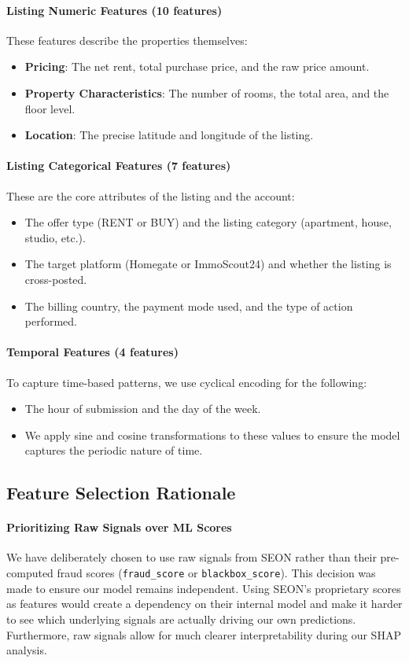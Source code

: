 \paragraph{Listing Numeric Features (10 features)}
These features describe the properties themselves:
\begin{itemize}
    \item \textbf{Pricing}: The net rent, total purchase price, and the raw price amount.
    \item \textbf{Property Characteristics}: The number of rooms, the total area, and the floor level.
    \item \textbf{Location}: The precise latitude and longitude of the listing.
\end{itemize}

\paragraph{Listing Categorical Features (7 features)}
These are the core attributes of the listing and the account:
\begin{itemize}
    \item The offer type (RENT or BUY) and the listing category (apartment, house, studio, etc.).
    \item The target platform (Homegate or ImmoScout24) and whether the listing is cross-posted.
    \item The billing country, the payment mode used, and the type of action performed.
\end{itemize}

\paragraph{Temporal Features (4 features)}
To capture time-based patterns, we use cyclical encoding for the following:
\begin{itemize}
    \item The hour of submission and the day of the week.
    \item We apply sine and cosine transformations to these values to ensure the model captures the periodic nature of time.
\end{itemize}

\subsection{Feature Selection Rationale}

\paragraph{Prioritizing Raw Signals over ML Scores}
We have deliberately chosen to use raw signals from SEON rather than their pre-computed fraud scores (\texttt{fraud\_score} or \texttt{blackbox\_score}). This decision was made to ensure our model remains independent. Using SEON's proprietary scores as features would create a dependency on their internal model and make it harder to see which underlying signals are actually driving our own predictions. Furthermore, raw signals allow for much clearer interpretability during our SHAP analysis.

